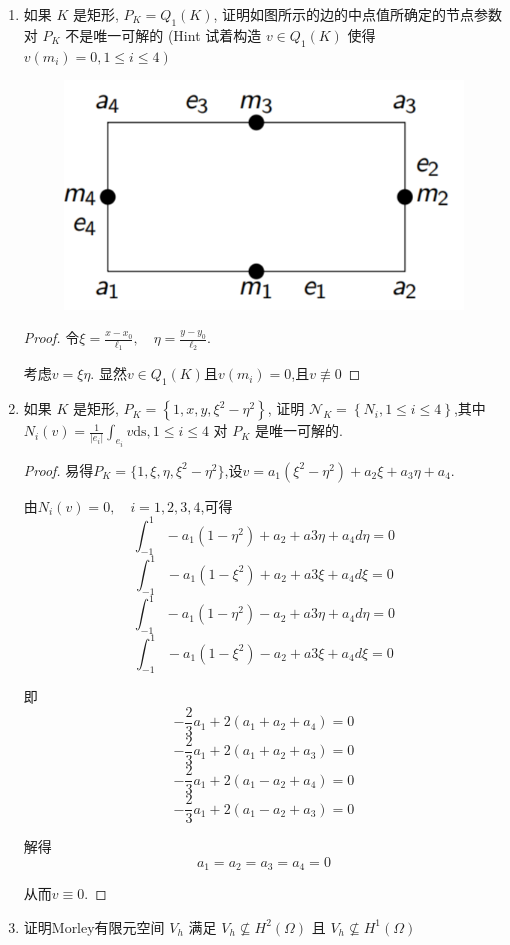 \documentclass[12pt,a4paper]{article}
\begin{document}
	\newpage
	
	\begin{enumerate}
		\item 如果 $K$ 是矩形, $P_K=Q_1(K)$, 证明如图所示的边的中点值所确定的节点参数对 $P_K$ 不是唯一可解的 (Hint 试着构造 $v \in Q_1(K)$ 使得 $\left.v\left(m_i\right)=0,1 \leq i \leq 4\right)$
		\begin{figure}[h]
			\centering
			\includegraphics[width=0.7\linewidth]{rec}
			\label{fig:rec}
		\end{figure}
		
		\begin{proof}
			令$\xi=\frac{x-x_0}{\ell_1},\quad\eta=\frac{y-y_0}{\ell_2}.$
			
			考虑$v = \xi \eta$. 显然$v \in Q_1(K)$且$v(m_i)=0$,且$v \not\equiv 0$
		\end{proof}
		
		\item 如果 $K$ 是矩形, $P_K=\left\{1, x, y, \xi^2-\eta^2\right\}$, 证明 $\mathcal{N}_K=\left\{N_i, 1 \leq i \leq 4\right\}$,其中 $N_i(v)=\frac{1}{\left|e_i\right|} \int_{e_i} v \mathrm{ds}, 1 \leq i \leq 4$ 对 $P_K$ 是唯一可解的.
		
		\begin{proof}
			易得$P_K=\{1,\xi,\eta,\xi^2-\eta^2\}$,设$v = a_1 (\xi^2 - \eta^2) + a_2 \xi +a_3 \eta +a_4$.
			
			由$N_i(v) = 0, \quad i = 1,2,3,4$,可得
			$$\int_{-1}^1 -a_1 (1-\eta^2) + a_2 + a3\eta + a_4 d\eta =0$$
			$$\int_{-1}^1 -a_1 (1-\xi^2) + a_2 + a3\xi + a_4 d\xi =0$$
			$$\int_{-1}^1 -a_1 (1-\eta^2) - a_2 + a3\eta + a_4 d\eta =0$$
			$$\int_{-1}^1 -a_1 (1-\xi^2) - a_2 + a3\xi + a_4 d\xi =0$$
			
			即
			$$-\frac{2}{3}a_1+2(a_1+a_2+a_4)=0$$
			$$-\frac{2}{3}a_1+2(a_1+a_2+a_3)=0$$
			$$-\frac{2}{3}a_1+2(a_1-a_2+a_4)=0$$
			$$-\frac{2}{3}a_1+2(a_1-a_2+a_3)=0$$
			
			解得
			$$a_1=a_2=a_3=a_4 = 0$$
			
			从而$v \equiv 0$.
		\end{proof}
		\item 证明Morley有限元空间 $V_h$ 满足 $V_h \nsubseteq H^2(\Omega)$ 且 $V_h \nsubseteq H^1(\Omega)$
		

\end{enumerate}
\end{document}

